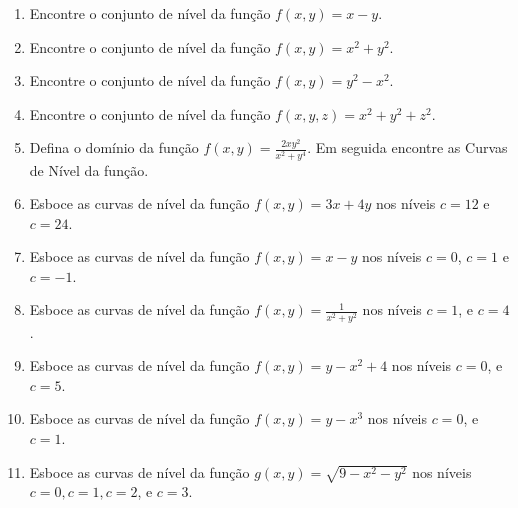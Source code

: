\documentclass[11pt,a4paper]{article}
\begin{document}
\begin{enumerate}
\item Encontre o conjunto de nível da função $f(x,y) = x - y$.

\item Encontre o conjunto de nível da função $f(x,y) = x^2 + y^2$.

\item Encontre o conjunto de nível da função $f(x,y) = y^2 - x^2$.












\item Encontre o conjunto de nível da função $f(x,y,z) = x^2 + y^2 + z^2$.

\item Defina o domínio da função $f(x,y) = \displaystyle\frac{2xy^2}{x^2 + y^4}$. Em seguida encontre as Curvas de Nível da função.

\item Esboce as curvas de nível da função $f(x,y) = 3x + 4y$ nos níveis $c = 12$ e $c = 24$.

\item Esboce as curvas de nível da função $f(x,y) = x - y$ nos níveis $c = 0$, $c = 1$ e $c = -1$.

\item Esboce as curvas de nível da função $f(x,y) = \displaystyle\frac{1}{x^2 + y^2}$ nos níveis $c = 1$, e $c = 4$.

\item Esboce as curvas de nível da função $f(x,y) = y - x^2 + 4$ nos níveis $c = 0$, e $c = 5$.

\item Esboce as curvas de nível da função $f(x,y) = y - x^3$ nos níveis $c = 0$, e $c = 1$.

\item Esboce as curvas de nível da função $g(x,y) = \sqrt{9 - x^2 - y^2}$ nos níveis $c = 0, c = 1, c = 2$, e $c = 3$.

\end{enumerate}
\end{document}
